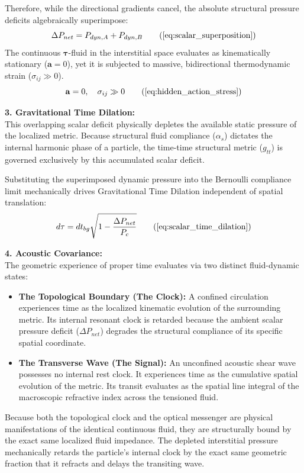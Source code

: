 \documentclass[11pt, a4paper]{article}
\begin{document}
Therefore, while the directional gradients cancel, the absolute structural pressure deficits algebraically superimpose:
\begin{equation}
    \Delta P_{net} = P_{dyn,A} + P_{dyn,B} \tag{\ref{eq:scalar_superposition}}
\end{equation}
The continuous $\boldsymbol{\tau}$-fluid in the interstitial space evaluates as kinematically stationary ($\mathbf{a} = 0$), yet it is subjected to massive, bidirectional thermodynamic strain ($\sigma_{ij} \gg 0$).
\begin{equation}
    \mathbf{a} = 0, \quad \sigma_{ij} \gg 0 \tag{\ref{eq:hidden_action_stress}}
\end{equation}

\textbf{3. Gravitational Time Dilation:} \\
This overlapping scalar deficit physically depletes the available static pressure of the localized metric. Because structural fluid compliance ($\alpha_s$) dictates the internal harmonic phase of a particle, the time-time structural metric ($g_{tt}$) is governed exclusively by this accumulated scalar deficit.

Substituting the superimposed dynamic pressure into the Bernoulli compliance limit mechanically drives Gravitational Time Dilation independent of spatial translation:
\begin{equation}
    d\tau = dt_{bg} \sqrt{1 - \frac{\Delta P_{net}}{P_c}} \tag{\ref{eq:scalar_time_dilation}}
\end{equation}

\textbf{4. Acoustic Covariance:} \\
The geometric experience of proper time evaluates via two distinct fluid-dynamic states:
\begin{itemize}[leftmargin=*]
    \item \textbf{The Topological Boundary (The Clock):} A confined circulation experiences time as the localized kinematic evolution of the surrounding metric. Its internal resonant clock is retarded because the ambient scalar pressure deficit ($\Delta P_{net}$) degrades the structural compliance of its specific spatial coordinate.
    \item \textbf{The Transverse Wave (The Signal):} An unconfined acoustic shear wave possesses no internal rest clock. It experiences time as the cumulative spatial evolution of the metric. Its transit evaluates as the spatial line integral of the macroscopic refractive index across the tensioned fluid.
\end{itemize}
Because both the topological clock and the optical messenger are physical manifestations of the identical continuous fluid, they are structurally bound by the exact same localized fluid impedance. The depleted interstitial pressure mechanically retards the particle's internal clock by the exact same geometric fraction that it refracts and delays the transiting wave. 
\end{document}
